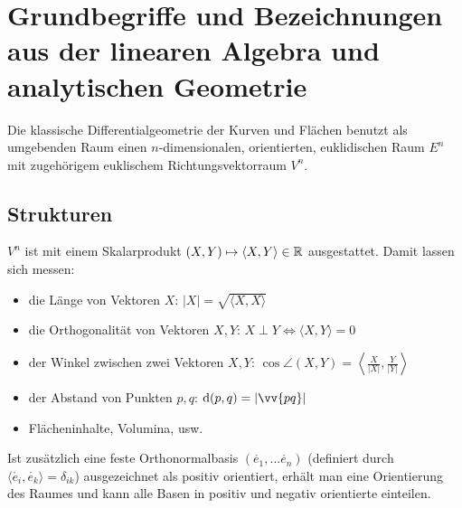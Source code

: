 \chapter{Grundbegriffe und Bezeichnungen aus der linearen Algebra und analytischen Geometrie}
  
  Die klassische Differentialgeometrie der Kurven und Flächen benutzt als umgebenden Raum einen \(n\)-dimensionalen, orientierten, euklidischen Raum \(E^n\) mit zugehörigem euklischem Richtungsvektorraum \(V^n\).

\section{Strukturen}
\(V^n\) ist mit einem Skalarprodukt \((X,Y) \mapsto \langle X, Y \rangle \in \mathbb{R}\) ausgestattet. 
Damit lassen sich messen:
  \begin{itemize}
   \item die Länge von Vektoren \(X\): \(|X| = \sqrt{ \langle X,X \rangle }\)
   \item die Orthogonalität von Vektoren \(X, Y\): \(X \perp Y \Leftrightarrow \langle X, Y \rangle = 0\)
   \item der Winkel zwischen zwei Vektoren \(X, Y\): \(\cos \angle (X, Y) = \left\langle \frac{X}{|X|}, \frac{Y}{|Y|} \right\rangle \)
   \item der Abstand von Punkten \(p, q\): \(\dd(p,q) = | \vv{pq} | \)
   \item Flächeninhalte, Volumina, usw.
  \end{itemize}
Ist zusätzlich eine feste Orthonormalbasis \( (\mathring{e_1}, ... \mathring{e_n}) \) (definiert durch \( \langle \mathring{e_i}, \mathring{e_k} \rangle = \delta_{ik} \)) ausgezeichnet als positiv orientiert, erhält man eine Orientierung des Raumes und kann alle Basen in positiv und negativ orientierte einteilen.
  
